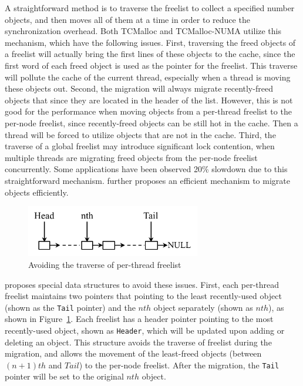 A straightforward method is to traverse the freelist to collect a specified number objects, and then moves all of them at a time in order to reduce the synchronization overhead. Both TCMalloc and TCMalloc-NUMA utilize this mechanism, which have the following issues. First, traversing the freed objects of a freelist will actually bring the first lines of these objects to the cache, since the first word of each freed object is used as the pointer for the freelist. This traverse will pollute the cache of the current thread, especially when a thread is moving these objects out. 
Second, the migration will always migrate recently-freed objects that since they are located in the header of the list. However, this is not good for the performance when moving objects from a per-thread freelist to the per-node freelist, since recently-freed objects can be still hot in the cache. Then a thread will be forced to utilize objects that are not in the cache. 
Third, the traverse of a global freelist may introduce significant lock contention, when multiple threads are migrating freed objects from the per-node freelist concurrently.
Some applications have been observed  20\% slowdown due to this straightforward mechanism. \NM{} further proposes an efficient mechanism to migrate objects efficiently. 

\begin{figure}[!h]
\centering
\includegraphics[width=3in]{figure/perthreadlist}
\caption{Avoiding the traverse of per-thread freelist\label{fig:perthreadlist}}
\end{figure}

\NM{} proposes special data structures to avoid these issues. First, each per-thread freelist maintains two pointers that pointing to the least recently-used object (shown as the \texttt{Tail} pointer) and the $nth$ object separately (shown as $nth$), as shown in Figure~\ref{fig:perthreadlist}. Each freelist has a header pointer pointing to the most recently-used object, shown as \texttt{Header}, which will be updated upon adding or deleting an object. This structure avoids the traverse of freelist during the migration, and allows the movement of the least-freed objects (between $(n+1)th$ and $Tail$) to the per-node freelist. After the migration, the \texttt{Tail} pointer will be set to the original $nth$ object. 

